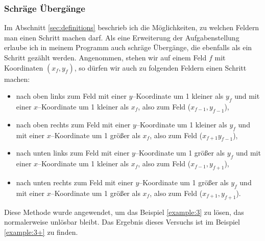 \documentclass[a4paper,10pt,ngerman]{scrartcl}
\begin{document}
\subsubsection{Schräge Übergänge}\label{sec:slant}
Im Abschnitt \ref{sec:definitions} beschrieb ich die Möglichkeiten, zu welchen Feldern man einen Schritt machen darf.
Als eine Erweiterung der Aufgabenstellung erlaube ich in meinem Programm auch schräge Übergänge, die ebenfalls
als ein Schritt gezählt werden. Angenommen, stehen wir auf einem Feld $f$ mit Koordinaten $(x_f, y_f)$, so dürfen wir auch zu folgenden Feldern
einen Schritt machen:
\begin{itemize}
  \item nach oben links zum Feld mit einer $y$--Koordinate um 1 kleiner als $y_f$ und mit einer $x$--Koordinate um 1 kleiner als $x_f$,
    also zum Feld ($x_{f-1},y_{f-1}$),
  \item nach oben rechts zum Feld mit einer $y$--Koordinate um 1 kleiner als $y_f$ und mit einer $x$--Koordinate um 1 größer als $x_f$,
    also zum Feld ($x_{f+1}y_{f-1}$),
  \item nach unten links zum Feld mit einer $y$--Koordinate um 1 größer als $y_f$ und mit einer $x$--Koordinate um 1 kleiner als $x_f$,
    also zum Feld ($x_{f-1},y_{f+1}$),
  \item nach unten rechts zum Feld mit einer $y$--Koordinate um 1 größer als $y_f$ und mit einer $x$--Koordinate um 1 größer als $x_f$,
    also zum Feld ($x_{f+1},y_{f+1}$).
\end{itemize}

Diese Methode wurde angewendet, um das Beispiel \ref{example:3} zu lösen, das normalerweise unlösbar bleibt.
Das Ergebnis dieses Versuchs ist im Beispiel \ref{example:3+} zu finden.

\nocite{*}
\printbibliography

\newpage
\end{document}
